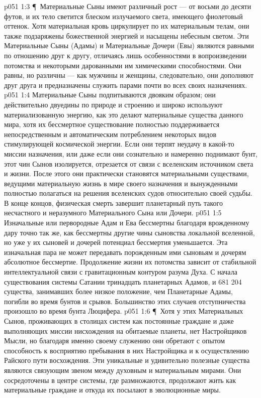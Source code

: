 \vs p051 1:3 \P\ Материальные Сыны имеют различный рост --- от восьми до десяти футов, и их тело светится блеском излучаемого света, имеющего фиолетовый оттенок. Хотя материальная кровь циркулирует по их материальным телам, они также подзаряжены божественной энергией и насыщены небесным светом. Эти Материальные Сыны (Адамы) и Материальные Дочери (Евы) являются равными по отношению друг к другу, отличаясь лишь особенностями в вопроизведении потомства и некоторыми дарованными им химическими способностями. Они равны, но различны --- как мужчины и женщины, следовательно, они дополняют друг друга и предназначены служить парами почти во всех своих назначениях.
\vs p051 1:4 Материальные Сыны подпитываются двояким образом; они действительно двуедины по природе и строению и широко используют материализованную энергию, как это делают материальные существа данного мира, хотя их бессмертное существование полностью поддерживается непосредственным и автоматическим потреблением некоторых видов стимулирующей космической энергии. Если они терпят неудачу в какой\hyp{}то миссии назначения, или даже если они сознательно и намеренно поднимают бунт, этот чин Сынов изолируется, отрезается от связи с вселенским источником света и жизни. После этого они практически становятся материальными существами, ведущими материальную жизнь в мире своего назначения и вынужденными полностью полагаться на решения вселенских судов относительно своей судьбы. В конце концов, физическая смерть завершит планетарный путь такого несчастного и неразумного Материального Сына или Дочери.
\vs p051 1:5 Изначальные или первородные Адам и Ева бессмертны благодаря врожденному дару точно так же, как бессмертны другие чины сыновства локальной вселенной, но уже у их сыновей и дочерей потенциал бессмертия уменьшается. Эта изначальная пара не может передавать порожденным ими сыновьям и дочерям абсолютное бессмертие. Продолжение жизни их потомства зависит от стабильной интеллектуальной связи с гравитационным контуром разума Духа. С начала существования системы Сатании тринадцать планетарных Адамов, и 681 204 существа, занимавших более низкое положение, чем Планетарные Адамы, погибли во время бунтов и срывов. Большинство этих случаев отступничества произошло во время бунта Люцифера.
\vs p051 1:6 \P\ Хотя у этих Материальных Сынов, проживающих в столицах систем как постоянные граждане и даже выполняющих миссии нисхождения на обитаемые планеты, нет Настройщиков Мысли, но благодаря именно своему служению они обретают с опытом способность к восприятию пребывания в них Настройщика и к осуществлению Райского пути восхождения. Эти уникальные и удивительно полезные существа являются связующим звеном между духовным и материальным мирами. Они сосредоточены в центре системы, где размножаются, продолжают жить как материальные граждане и откуда их посылают в эволюционные миры.
